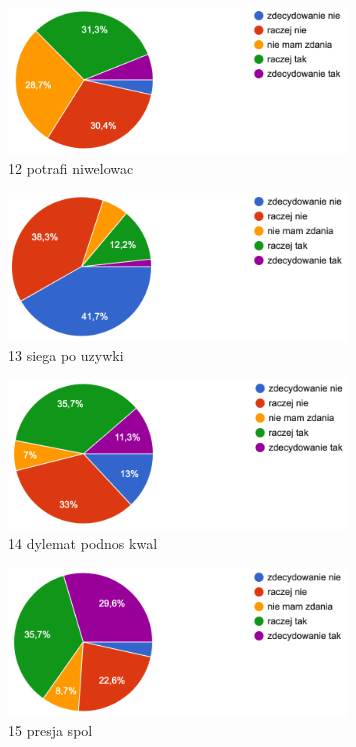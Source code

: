 \begin{figure}
    \includegraphics[width=9cm]{wyniki/12_potrafi_niwelowac}
    \caption{ 12 potrafi niwelowac }
\end{figure}

\begin{figure}
    \includegraphics[width=9cm]{wyniki/13_siega_po_uzywki}
    \caption{ 13 siega po uzywki }
\end{figure}

\begin{figure}
    \includegraphics[width=9cm]{wyniki/14_dylemat_podnos_kwal}
    \caption{ 14 dylemat podnos kwal }
\end{figure}

\begin{figure}
    \includegraphics[width=9cm]{wyniki/15_presja_spol}
    \caption{ 15 presja spol }
\end{figure}

